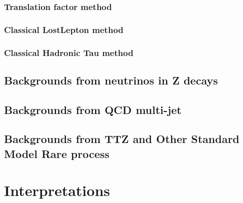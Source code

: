 \clearpage
\subsubsection{Translation factor method}

\clearpage
\subsubsection{Classical LostLepton method}
\label{sec:c4bgll}


\clearpage
\subsubsection{Classical Hadronic Tau method}

\clearpage
\subsection{Backgrounds from neutrinos in Z decays}

\clearpage
\subsection{Backgrounds from QCD multi-jet}
\label{sec:c4bgqcd}


\clearpage
\subsection{Backgrounds from TTZ and Other Standard Model Rare process}

\clearpage
\section{Interpretations}
